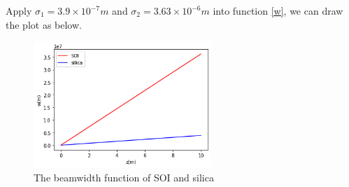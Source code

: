 \documentclass[fontsize=11pt]{scrartcl}
\begin{document}
Apply $\sigma _1 = 3.9 \times 10^{-7}m$ and $\sigma _2 = 3.63 \times 10^{-6}m$ 
into function \ref{w}, we can draw the plot as below.
\begin{figure}[H]
    \centering
     \includegraphics[width=0.6\textwidth]{img/task3_plot.png}
     \caption{The beamwidth function of SOI and silica}
     \label{fig3.1}
\end{figure}
\pagebreak
\end{document}
